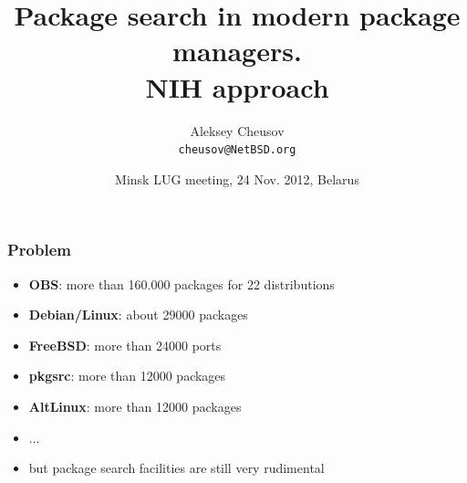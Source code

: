 \documentclass[hyperref=unicode,ascii,xcolor=dvipsnames]{beamer}
\title{Package search in modern package managers.\\
NIH approach}
\author{Aleksey Cheusov\\
  \texttt{cheusov@NetBSD.org}}
\date{Minsk LUG meeting, 24 Nov. 2012, Belarus}
\begin{document}

\newenvironment{Code}[1]%
              {\Verbatim[label=\bf{#1},frame=single,%
                  fontsize=\small,%
                  commandchars=\\\{\}]}%
              {\endVerbatim}


\newenvironment{CodeNoLabel}%
               {\Verbatim[frame=single,%
                   fontsize=\small,%
                   commandchars=\\\{\}]}%
               {\endVerbatim}

\newenvironment{CodeNoLabelSmallest}%
               {\Verbatim[frame=single,%
                   fontsize=\footnotesize,%
                   commandchars=\\\{\}]}%
               {\endVerbatim}
\newenvironment{CodeLarge}%
               {\Verbatim[frame=single,%
                   fontsize=\large,%
                   commandchars=\\\{\}]}%
               {\endVerbatim}

\newcommand{\prompt}[1]{{\bf{#1}}}
\newcommand{\h}[1]{{\bf{#1}}}
\newcommand{\URL}[1]{\textbf{#1}}
\newcommand{\AutohellFile}[1]{\textcolor{red}{#1}}
\newcommand{\MKCfile}[1]{\textcolor{green}{#1}}
\newcommand{\ModuleName}[1]{\textbf{#1}\textnormal{}}
\newcommand{\ProgName}[1]{\textbf{#1}\textnormal{}}
\newcommand{\ProjectName}[1]{\textbf{#1}\textnormal{}}
\newcommand{\PackageName}[1]{\textbf{#1}\textnormal{}}
\newcommand{\MKC}[1]{\large\textsf{#1}\textnormal{}\normalsize}

\begin{frame}
  \titlepage
\end{frame}

\begin{frame}[fragile]
  \frametitle{Problem}
  \begin{itemize}
  \item {\bf OBS}: more than 160.000 packages for 22 distributions
  \item {\bf Debian/Linux}: about 29000 packages
  \item {\bf FreeBSD}: more than 24000 ports
  \item {\bf pkgsrc}: more than 12000 packages
  \item {\bf AltLinux}: more than 12000 packages
  \item ...
  \item but package search facilities are still very rudimental
  \end{itemize}
\end{frame}
\end{document}
